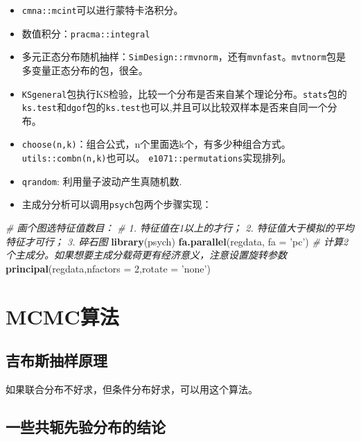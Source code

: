 \documentclass[
]{book}
\newenvironment{Shaded}{\begin{snugshade}}{\end{snugshade}}
\newcommand{\CommentTok}[1]{\textcolor[rgb]{0.56,0.35,0.01}{\textit{#1}}}
\newcommand{\DataTypeTok}[1]{\textcolor[rgb]{0.13,0.29,0.53}{#1}}
\newcommand{\DecValTok}[1]{\textcolor[rgb]{0.00,0.00,0.81}{#1}}
\newcommand{\KeywordTok}[1]{\textcolor[rgb]{0.13,0.29,0.53}{\textbf{#1}}}
\newcommand{\NormalTok}[1]{#1}
\newcommand{\StringTok}[1]{\textcolor[rgb]{0.31,0.60,0.02}{#1}}
\providecommand{\tightlist}{%
  \setlength{\itemsep}{0pt}\setlength{\parskip}{0pt}}
\begin{document}
\begin{itemize}
\tightlist
\item
  \texttt{cmna::mcint}可以进行蒙特卡洛积分。
\item
  数值积分：\texttt{pracma::integral}
\item
  多元正态分布随机抽样：\texttt{SimDesign::rmvnorm}，还有\texttt{mvnfast}。\texttt{mvtnorm}包是多变量正态分布的包，很全。
\item
  \texttt{KSgeneral}包执行KS检验，比较一个分布是否来自某个理论分布。\texttt{stats}包的\texttt{ks.test}和\texttt{dgof}包的\texttt{ks.test}也可以,并且可以比较双样本是否来自同一个分布。
\item
  \texttt{choose(n,k)}：组合公式，n个里面选k个，有多少种组合方式。\texttt{utils::combn(n,k)}也可以。 \texttt{e1071::permutations}实现排列。
\item
  \texttt{qrandom}: 利用量子波动产生真随机数.
\item
  主成分分析可以调用\texttt{psych}包两个步骤实现：
\end{itemize}

\begin{Shaded}
\begin{Highlighting}[]
\CommentTok{# 画个图选特征值数目：}
\CommentTok{# 1. 特征值在1以上的才行； 2. 特征值大于模拟的平均特征才可行； 3. 碎石图}
\KeywordTok{library}\NormalTok{(psych)}
\KeywordTok{fa.parallel}\NormalTok{(regdata, }\DataTypeTok{fa =} \StringTok{'pc'}\NormalTok{)}
\CommentTok{# 计算2个主成分。如果想要主成分载荷更有经济意义，注意设置旋转参数}
 \KeywordTok{principal}\NormalTok{(regdata,}\DataTypeTok{nfactors =} \DecValTok{2}\NormalTok{,}\DataTypeTok{rotate =} \StringTok{'none'}\NormalTok{)}
\end{Highlighting}
\end{Shaded}

\hypertarget{mcmcux7b97ux6cd5}{%
\section{MCMC算法}\label{mcmcux7b97ux6cd5}}

\hypertarget{ux5409ux5e03ux65afux62bdux6837ux539fux7406}{%
\subsection{吉布斯抽样原理}\label{ux5409ux5e03ux65afux62bdux6837ux539fux7406}}

如果联合分布不好求，但条件分布好求，可以用这个算法。

\hypertarget{ux4e00ux4e9bux5171ux8f6dux5148ux9a8cux5206ux5e03ux7684ux7ed3ux8bba}{%
\subsection{一些共轭先验分布的结论}\label{ux4e00ux4e9bux5171ux8f6dux5148ux9a8cux5206ux5e03ux7684ux7ed3ux8bba}}
\end{document}
